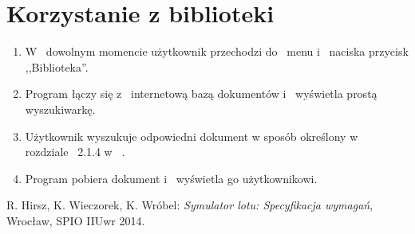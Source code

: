 \documentclass{mwrep}
\begin{document}
\section{Korzystanie z biblioteki}
\begin{enumerate}
  \item W~ dowolnym momencie użytkownik przechodzi do~ menu i~ naciska przycisk ,,Biblioteka''.
  \item Program łączy się z~ internetową bazą dokumentów i~ wyświetla prostą wyszukiwarkę.
  \item Użytkownik wyszukuje odpowiedni dokument w sposób określony w~ rozdziale~ 2.1.4 w~ \cite{WYM}.
  \item Program pobiera dokument i~ wyświetla go użytkownikowi.
\end{enumerate}

\begin{thebibliography}{9}
   R. Hirsz, K. Wieczorek, K. Wróbel: \textit{Symulator lotu: Specyfikacja wymagań}, Wrocław, SPIO IIUwr 2014.
\end{thebibliography}
\end{document}
